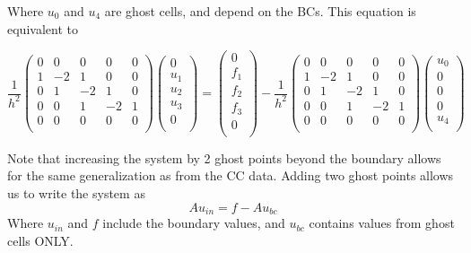 \documentclass[11pt]{article}
\begin{document}
Where $u_0$ and $u_4$ are ghost cells, and depend on the BCs. This equation is equivalent to

\begin{equation}
\frac{1}{h^2}
 \begin{pmatrix}
  0 &  0 &  0 &  0 &  0 \\
  1 & -2 &  1 &  0 &  0 \\
  0 &  1 & -2 &  1 &  0 \\
  0 &  0 &  1 & -2 &  1 \\
  0 &  0 &  0 &  0 &  0 \\
 \end{pmatrix}
 \begin{pmatrix}
  0 \\  u_1 \\  u_2 \\  u_3 \\  0 \\
 \end{pmatrix}
  = 
 \begin{pmatrix}
  0 \\  f_1 \\  f_2 \\  f_3 \\  0 \\
 \end{pmatrix}
   -
\frac{1}{h^2}
 \begin{pmatrix}
  0 &  0 &  0 &  0 &  0 \\
  1 & -2 &  1 &  0 &  0 \\
  0 &  1 & -2 &  1 &  0 \\
  0 &  0 &  1 & -2 &  1 \\
  0 &  0 &  0 &  0 &  0 \\
 \end{pmatrix}
 \begin{pmatrix}
  u_0 \\  0 \\  0 \\  0 \\  u_4 \\
 \end{pmatrix}
\end{equation}

Note that increasing the system by 2 ghost points beyond the boundary allows for the same generalization as from the CC data. Adding two ghost points allows us to write the system as
\begin{equation}
Au_{in} = f - Au_{bc}
\end{equation}
Where $u_{in}$ and $f$ include the boundary values, and $u_{bc}$ contains values from ghost cells ONLY.
\end{document}
